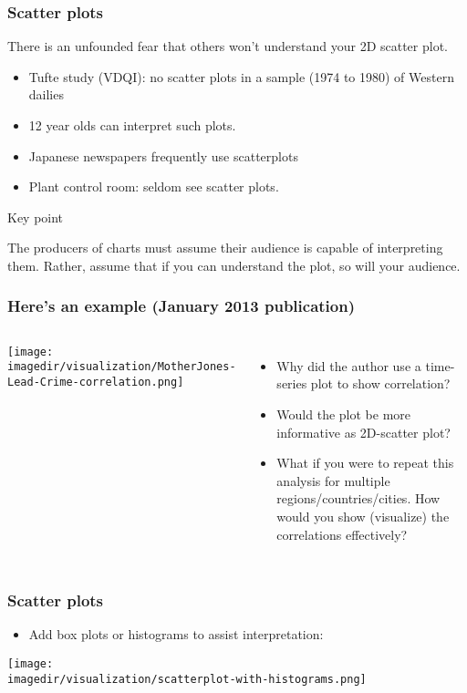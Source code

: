 \begin{frame}\frametitle{Scatter plots}
	There is an unfounded fear that others won't understand your 2D scatter plot. 
	\begin{itemize}
		\item	Tufte study (VDQI): no scatter plots in a sample (1974 to 1980) of Western dailies 
		\item	12 year olds can interpret such plots. 
		\item	Japanese newspapers frequently use scatterplots 
		\item	Plant control room: seldom see scatter plots. 
	\end{itemize}
	\begin{block}
		{Key point} 
		\begin{center}
			The producers of charts must assume their audience is capable of interpreting them. Rather, assume that if you can understand the plot, so will your audience. 
		\end{center}
	\end{block}
\end{frame}

\begin{frame}\frametitle{Here's an example (January 2013 publication)}
	\begin{columns}[t]
			\begin{center}
				\texttt{[image: \\imagedir/visualization/MotherJones-Lead-Crime-correlation.png]}
			\end{center}
			\begin{itemize}
				\item	Why did the author use a time-series plot to show correlation?
				\item	Would the plot be more informative as 2D-scatter plot?
				\item	What if you were to repeat this analysis for multiple regions/countries/cities. How would you show (visualize) the correlations effectively?
			\end{itemize}
	\end{columns}
	\vspace{-3pt}
\end{frame}

\begin{frame}\frametitle{Scatter plots}
	\begin{itemize}
		\item	Add box plots or histograms to assist interpretation: 
	\end{itemize}
	\begin{center}
		\texttt{[image: \\imagedir/visualization/scatterplot-with-histograms.png]}
	\end{center}
\end{frame}

